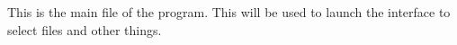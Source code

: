 This is the main file of the program. This will be used to launch the interface to select files and other things. 